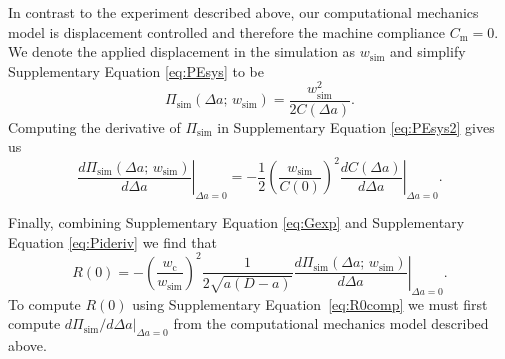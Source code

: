 \documentclass[12pt,onecolumn]{article}
\begin{document}
\begin{bibunit}
In contrast to the experiment described above, our computational mechanics model is displacement controlled and therefore the machine compliance $C_\mathrm{m}=0$. We denote the applied displacement in the simulation as $w_\mathrm{sim}$ and simplify Supplementary Equation \eqref{eq:PEsys} to be
%
\begin{equation}
    \label{eq:PEsys2}
    \Pi_\mathrm{sim}(\Delta a;\,w_\mathrm{sim})=\frac{w_\mathrm{sim}^2}{2C(\Delta a)}.
\end{equation}
%
Computing the derivative of $\Pi_\mathrm{sim}$ in Supplementary Equation \eqref{eq:PEsys2} gives us
%
\begin{equation}
    \label{eq:Pideriv}
    \left.\frac{d \Pi_\mathrm{sim}(\Delta a;\,w_\mathrm{sim})}{d\Delta a}\right\vert_{\Delta a=0}=-\frac{1}{2}\left(\frac{w_\mathrm{sim}}{C(0)}\right)^2\left.\frac{dC(\Delta a)}{d\Delta a}\right\vert_{\Delta a=0}.
\end{equation}

Finally, combining Supplementary Equation \eqref{eq:Gexp} and Supplementary Equation \eqref{eq:Pideriv} we find that
%
\begin{equation}
    \label{eq:R0comp}
    R(0)=-\left(\frac{w_\mathrm{c}}{w_\mathrm{sim}}\right)^2\frac{1}{2\sqrt{a(D-a)}}\left.\frac{d\Pi_\mathrm{sim}(\Delta a;\,w_\mathrm{sim})}{d\Delta a}\right \vert_{\Delta a=0}.
\end{equation}
%
To compute $R(0)$ using Supplementary Equation~\eqref{eq:R0comp} we must first compute $d\Pi_\mathrm{sim}/d\Delta a\vert_{\Delta a=0}$ from the computational mechanics model described above.


\end{bibunit}
\end{document}
